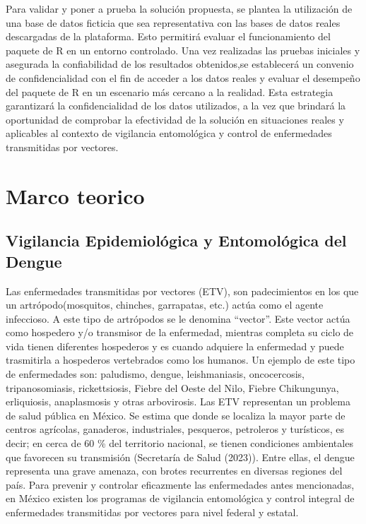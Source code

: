 \documentclass[
  letterpaper,
  twocolumn,
  landscape]{report}
\begin{document}
Para validar y poner a prueba la solución propuesta, se plantea la
utilización de una base de datos ficticia que sea representativa con las
bases de datos reales descargadas de la plataforma. Esto permitirá
evaluar el funcionamiento del paquete de R en un entorno controlado. Una
vez realizadas las pruebas iniciales y asegurada la confiabilidad de los
resultados obtenidos,se establecerá un convenio de confidencialidad con
el fin de acceder a los datos reales y evaluar el desempeño del paquete
de R en un escenario más cercano a la realidad. Esta estrategia
garantizará la confidencialidad de los datos utilizados, a la vez que
brindará la oportunidad de comprobar la efectividad de la solución en
situaciones reales y aplicables al contexto de vigilancia entomológica y
control de enfermedades transmitidas por vectores.


\chapter{Marco teorico}\label{marco-teorico}

\section{Vigilancia Epidemiológica y Entomológica del
Dengue}\label{vigilancia-epidemioluxf3gica-y-entomoluxf3gica-del-dengue}

Las enfermedades transmitidas por vectores (ETV), son padecimientos en
los que un artrópodo(mosquitos, chinches, garrapatas, etc.) actúa como
el agente infeccioso. A este tipo de artrópodos se le denomina
``vector''. Este vector actúa como hospedero y/o transmisor de la
enfermedad, mientras completa su ciclo de vida tienen diferentes
hospederos y es cuando adquiere la enfermedad y puede trasmitirla a
hospederos vertebrados como los humanos. Un ejemplo de este tipo de
enfermedades son: paludismo, dengue, leishmaniasis, oncocercosis,
tripanosomiasis, rickettsiosis, Fiebre del Oeste del Nilo, Fiebre
Chikungunya, erliquiosis, anaplasmosis y otras arbovirosis. Las ETV
representan un problema de salud pública en México. Se estima que donde
se localiza la mayor parte de centros agrícolas, ganaderos,
industriales, pesqueros, petroleros y turísticos, es decir; en cerca de
60 \% del territorio nacional, se tienen condiciones ambientales que
favorecen su transmisión (Secretaría de Salud (2023)). Entre ellas, el
dengue representa una grave amenaza, con brotes recurrentes en diversas
regiones del país. Para prevenir y controlar eficazmente las
enfermedades antes mencionadas, en México existen los programas de
vigilancia entomológica y control integral de enfermedades transmitidas
por vectores para nivel federal y estatal.
\end{document}
